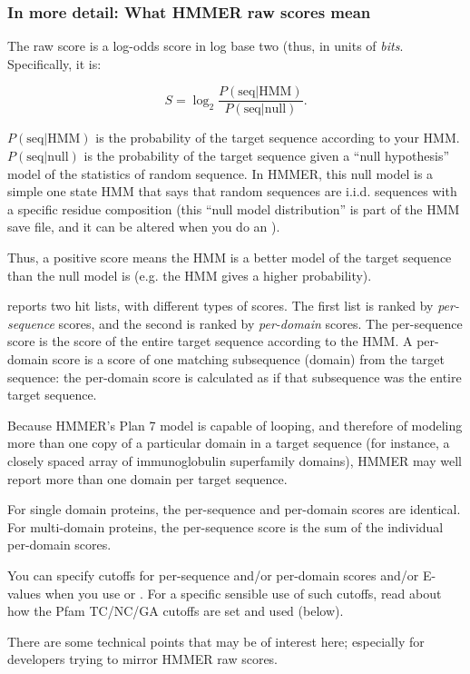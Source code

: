 \subsubsection{In more detail: What HMMER raw scores mean}

The raw score is a log-odds score in log base two (thus, in units of
{\em bits}. Specifically, it is:

\[
	S = \log_2 \frac {P( \mbox{seq} | \mbox{HMM})} { P (\mbox{seq} |
	\mbox{null})}.
\]

$P( \mbox{seq} | \mbox{HMM})$ is the probability of the target sequence
according to your HMM. $ P (\mbox{seq} | \mbox{null}) $ is the
probability of the target sequence given a ``null hypothesis'' model
of the statistics of random sequence. In HMMER, this null model is a
simple one state HMM that says that random sequences are i.i.d.
sequences with a specific residue composition (this ``null model
distribution'' is part of the HMM save file, and it can be altered
when you do an ).

Thus, a positive score means the HMM is a better model of the target
sequence than the null model is (e.g. the HMM gives a higher
probability).

 reports two hit lists, with different types of
scores. The first list is ranked by {\em per-sequence} scores, and the
second is ranked by {\em per-domain} scores. The per-sequence score is
the score of the entire target sequence according to the HMM. A
per-domain score is a score of one matching subsequence (domain) from
the target sequence: the per-domain score is calculated as if that
subsequence was the entire target sequence. 

Because HMMER's Plan 7 model is capable of looping, and therefore of
modeling more than one copy of a particular domain in a target
sequence (for instance, a closely spaced array of immunoglobulin
superfamily domains), HMMER may well report more than one domain per
target sequence.

For single domain proteins, the per-sequence and per-domain scores are
identical. For multi-domain proteins, the per-sequence score is the
sum of the individual per-domain scores.

You can specify cutoffs for per-sequence and/or per-domain scores
and/or E-values when you use  or .  For
a specific sensible use of such cutoffs, read about how the Pfam
TC/NC/GA cutoffs are set and used (below).

There are some technical points that may be of interest here;
especially for developers trying to mirror HMMER raw scores.

